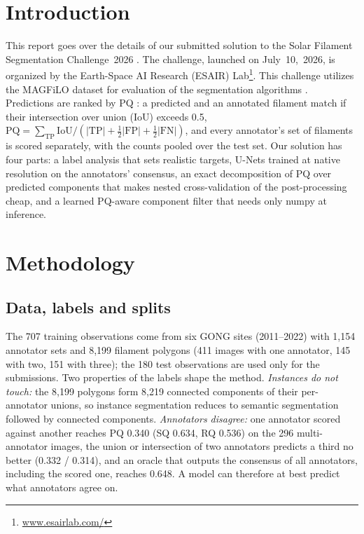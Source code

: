 \documentclass[sigconf]{acmart}
\begin{document}
\section{Introduction}
    This report goes over the details of our submitted solution to the Solar Filament Segmentation Challenge~2026 \cite{filament-segmentation-2026}. The challenge, launched on July~10,~2026, is organized by the Earth-Space AI Research (ESAIR) Lab\footnote{\href{https://www.esairlab.com/home}{www.esairlab.com/}}. This challenge utilizes the MAGFiLO dataset for evaluation of the segmentation algorithms \cite{ahmadzadeh2024dataset}. Predictions are ranked by PQ \cite{kirillov2019panoptic}: a predicted and an annotated filament match if their intersection over union (IoU) exceeds 0.5, $\mathrm{PQ}=\sum_{\mathrm{TP}}\mathrm{IoU}/(|\mathrm{TP}|+\tfrac12|\mathrm{FP}|+\tfrac12|\mathrm{FN}|)$, and every annotator's set of filaments is scored separately, with the counts pooled over the test set. Our solution has four parts: a label analysis that sets realistic targets, U-Nets trained at native resolution on the annotators' consensus, an exact decomposition of PQ over predicted components that makes nested cross-validation of the post-processing cheap, and a learned PQ-aware component filter that needs only numpy at inference.


\section{Methodology}\label{sec:methodology}

\subsection{Data, labels and splits}
The 707 training observations come from six GONG \cite{harvey1996gong} sites (2011--2022) with 1,154 annotator sets and 8,199 filament polygons (411 images with one annotator, 145 with two, 151 with three); the 180 test observations are used only for the submissions. Two properties of the labels shape the method. \emph{Instances do not touch:} the 8,199 polygons form 8,219 connected components of their per-annotator unions, so instance segmentation reduces to semantic segmentation followed by connected components. \emph{Annotators disagree:} one annotator scored against another reaches PQ 0.340 (SQ 0.634, RQ 0.536) on the 296 multi-annotator images, the union or intersection of two annotators predicts a third no better (0.332 / 0.314), and an oracle that outputs the consensus of all annotators, including the scored one, reaches 0.648. A model can therefore at best predict what annotators agree on.
\end{document}
